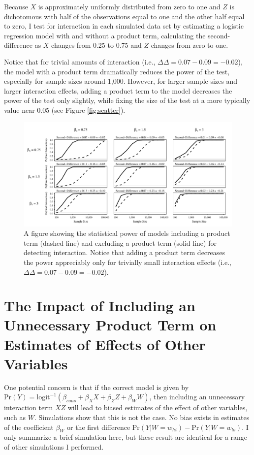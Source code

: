 \documentclass[12pt]{article}
\begin{document}
\begin{appendix}
Because $X$ is approximately uniformly distributed from zero to one and $Z$ is dichotomous with half of the observations equal to one and the other half equal to zero, I test for interaction in each simulated data set by estimating a logistic regression model with and without a product term, calculating the second-difference as $X$ changes from 0.25 to 0.75 and $Z$ changes from zero to one. 

Notice that for trivial amounts of interaction (i.e., $\Delta\Delta = 0.07-0.09 = -0.02$), the model with a product term dramatically reduces the power of the test, especially for sample sizes around 1,000. However, for larger sample sizes and larger interaction effects, adding a product term to the model decreases the power of the test only slightly, while fixing the size of the test at a more typically value near 0.05 (see Figure \ref{fig:scatter}).

\begin{figure}[H]
\begin{center}
\includegraphics[scale = .8]{fig/fig-pwr.pdf}
\end{center}\caption{A figure showing the statistical power of models including a product term (dashed line) and excluding a product term (solid line) for detecting interaction. Notice that adding a product term decreases the power appreciably only for trivially small interaction effects (i.e., $\Delta\Delta = 0.07-0.09 = -0.02$).}\label{fig:pwr}
\end{figure}

\section*{The Impact of Including an Unnecessary Product Term on Estimates of Effects of Other Variables}

One potential concern is that if the correct model is given by $\text{Pr}(Y) = \text{logit}^{-1}(\beta_{cons} + \beta_XX + \beta_ZZ + \beta_{W}W)$, then including an unnecessary interaction term $XZ$ will lead to biased estimates of the effect of other variables, such as $W$. Simulations show that this is not the case. No bias exists in estimates of the coefficient $\beta_W$ or the first difference $\text{Pr}(Y | W = w_{hi}) - \text{Pr}(Y | W = w_{lo})$. I only summarize a brief simulation here, but these result are identical for a range of other simulations I performed.


\end{appendix}
\end{document}
